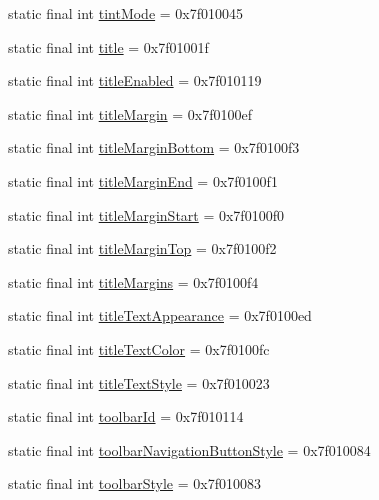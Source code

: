 \begin{CompactItemize}
static final int \hyperlink{classandroid_1_1support_1_1v4_1_1_r_1_1attr_b7958576b98aed7197abc47345e46744}{tintMode} = 0x7f010045
\item 
static final int \hyperlink{classandroid_1_1support_1_1v4_1_1_r_1_1attr_c61c98a2daf1e6804a68ffb1424a8f2f}{title} = 0x7f01001f
\item 
static final int \hyperlink{classandroid_1_1support_1_1v4_1_1_r_1_1attr_7551c66f76b8445295a8a5fb1a6f6b5f}{titleEnabled} = 0x7f010119
\item 
static final int \hyperlink{classandroid_1_1support_1_1v4_1_1_r_1_1attr_06c66b4c492b8c046c027c3bce8ac44e}{titleMargin} = 0x7f0100ef
\item 
static final int \hyperlink{classandroid_1_1support_1_1v4_1_1_r_1_1attr_125cf01c86693709e056b18508368445}{titleMarginBottom} = 0x7f0100f3
\item 
static final int \hyperlink{classandroid_1_1support_1_1v4_1_1_r_1_1attr_579b3a96bff28789353c5dac961fc466}{titleMarginEnd} = 0x7f0100f1
\item 
static final int \hyperlink{classandroid_1_1support_1_1v4_1_1_r_1_1attr_eea40cdc9dff4024fac377ecad1402c0}{titleMarginStart} = 0x7f0100f0
\item 
static final int \hyperlink{classandroid_1_1support_1_1v4_1_1_r_1_1attr_4b4e1164d08ee63f120528c1b28942b7}{titleMarginTop} = 0x7f0100f2
\item 
static final int \hyperlink{classandroid_1_1support_1_1v4_1_1_r_1_1attr_c0df1a123bc4809bee4ce3a5abc4b24d}{titleMargins} = 0x7f0100f4
\item 
static final int \hyperlink{classandroid_1_1support_1_1v4_1_1_r_1_1attr_488c758fbeaf764ce96fb05f39061e6c}{titleTextAppearance} = 0x7f0100ed
\item 
static final int \hyperlink{classandroid_1_1support_1_1v4_1_1_r_1_1attr_91a8307c3e8f3188e222aea2540bd64e}{titleTextColor} = 0x7f0100fc
\item 
static final int \hyperlink{classandroid_1_1support_1_1v4_1_1_r_1_1attr_c7ed41fc8bae383500307a9d918037c5}{titleTextStyle} = 0x7f010023
\item 
static final int \hyperlink{classandroid_1_1support_1_1v4_1_1_r_1_1attr_cad410b4f6328a475553f5c45c13bdaf}{toolbarId} = 0x7f010114
\item 
static final int \hyperlink{classandroid_1_1support_1_1v4_1_1_r_1_1attr_407d785f30938e6f2b0237fd3fca34f3}{toolbarNavigationButtonStyle} = 0x7f010084
\item 
static final int \hyperlink{classandroid_1_1support_1_1v4_1_1_r_1_1attr_5bcb792a379d9c3dbecc780418df4a75}{toolbarStyle} = 0x7f010083

\end{CompactItemize}
